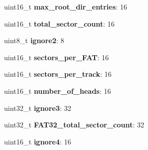 \begin{DoxyCompactItemize}
\item 
\hypertarget{struct_b_o_o_t___s_e_c_t_o_r_a2557d6423bb5ae8035998665da704814}{}uint16\+\_\+t {\bfseries max\+\_\+root\+\_\+dir\+\_\+entries}\+: 16\label{struct_b_o_o_t___s_e_c_t_o_r_a2557d6423bb5ae8035998665da704814}

\item 
\hypertarget{struct_b_o_o_t___s_e_c_t_o_r_ad52032df59625ed870342dd18c575b4d}{}uint16\+\_\+t {\bfseries total\+\_\+sector\+\_\+count}\+: 16\label{struct_b_o_o_t___s_e_c_t_o_r_ad52032df59625ed870342dd18c575b4d}

\item 
\hypertarget{struct_b_o_o_t___s_e_c_t_o_r_ae6fcef42227688ee9ed27f59f27e98fd}{}uint8\+\_\+t {\bfseries ignore2}\+: 8\label{struct_b_o_o_t___s_e_c_t_o_r_ae6fcef42227688ee9ed27f59f27e98fd}

\item 
\hypertarget{struct_b_o_o_t___s_e_c_t_o_r_a65b96da3a7719f0b4acc1384c635a24d}{}uint16\+\_\+t {\bfseries sectors\+\_\+per\+\_\+\+F\+A\+T}\+: 16\label{struct_b_o_o_t___s_e_c_t_o_r_a65b96da3a7719f0b4acc1384c635a24d}

\item 
\hypertarget{struct_b_o_o_t___s_e_c_t_o_r_a108ca47e46c1cf77fd4e9947899141b5}{}uint16\+\_\+t {\bfseries sectors\+\_\+per\+\_\+track}\+: 16\label{struct_b_o_o_t___s_e_c_t_o_r_a108ca47e46c1cf77fd4e9947899141b5}

\item 
\hypertarget{struct_b_o_o_t___s_e_c_t_o_r_af8b271a82f5e59e190d74d97ba5bffd7}{}uint16\+\_\+t {\bfseries number\+\_\+of\+\_\+heads}\+: 16\label{struct_b_o_o_t___s_e_c_t_o_r_af8b271a82f5e59e190d74d97ba5bffd7}

\item 
\hypertarget{struct_b_o_o_t___s_e_c_t_o_r_a76e5d040457c8c25e8859d359ecb58ea}{}uint32\+\_\+t {\bfseries ignore3}\+: 32\label{struct_b_o_o_t___s_e_c_t_o_r_a76e5d040457c8c25e8859d359ecb58ea}

\item 
\hypertarget{struct_b_o_o_t___s_e_c_t_o_r_a81ab9fdd4fd46780c7f0720da772ffa8}{}uint32\+\_\+t {\bfseries F\+A\+T32\+\_\+total\+\_\+sector\+\_\+count}\+: 32\label{struct_b_o_o_t___s_e_c_t_o_r_a81ab9fdd4fd46780c7f0720da772ffa8}

\item 
\hypertarget{struct_b_o_o_t___s_e_c_t_o_r_ab69a382c4fde7b709bc2bc8791b406df}{}uint16\+\_\+t {\bfseries ignore4}\+: 16\label{struct_b_o_o_t___s_e_c_t_o_r_ab69a382c4fde7b709bc2bc8791b406df}


\end{DoxyCompactItemize}
